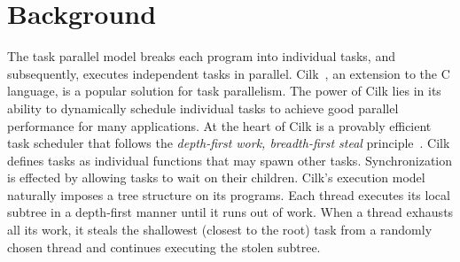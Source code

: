\documentclass{sig-alternate}
\begin{document}
\section{Background} \label{sec:background}
The task parallel model breaks each program into individual tasks, and
subsequently, executes independent tasks in parallel.  Cilk~\cite{FrigoLeRa98},
an extension to the C language, is a popular solution for task parallelism.
The power of Cilk lies in its ability to dynamically schedule individual tasks
to achieve good parallel performance for many applications. At the heart of
Cilk is a provably efficient task scheduler that follows the
\textit{depth-first work, breadth-first steal} principle~\cite{Blumofe94}. Cilk
defines tasks as individual functions that may spawn other tasks.
Synchronization is effected by allowing tasks to wait on their children.
Cilk's execution model naturally imposes a tree structure on its programs.
Each thread executes its local subtree in a depth-first manner until it runs
out of work. When a thread exhausts all its work, it steals the shallowest
(closest to the root) task from a randomly chosen thread and continues
executing the stolen subtree. 
\end{document}
